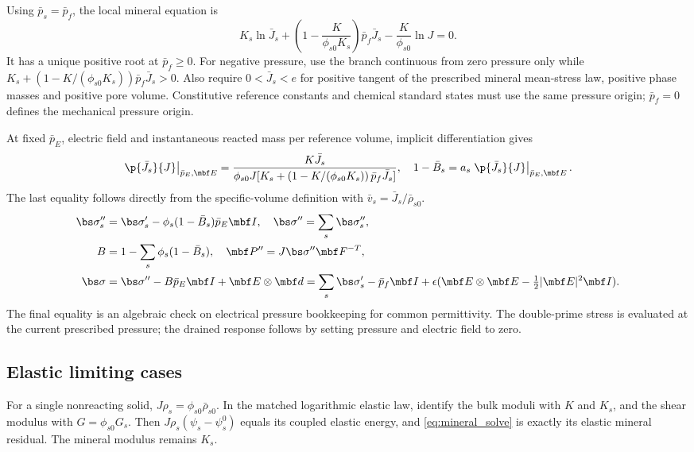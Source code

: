 \documentclass[11pt]{article}
\begin{document}
Using \(\bar p_s=\bar p_f\), the local mineral equation is
\begin{equation}
 K_s\ln\bar J_s+\left(1-\frac{K}{\phi_{s0}K_s}\right)\bar p_f\bar J_s-\frac{K}{\phi_{s0}}\ln J=0.
 \label{eq:mineral_solve}
\end{equation}
It has a unique positive root at \(\bar p_f\ge0\). For negative pressure, use the branch continuous from zero pressure only while
\(K_s+\left(1-K/(\phi_{s0}K_s)\right)\bar p_f\bar J_s>0\).
Also require \(0<\bar J_s<e\) for positive tangent of the prescribed mineral mean-stress law, positive phase masses and positive pore volume. Constitutive reference constants and chemical standard states must use the same pressure origin; \(\bar p_f=0\) defines the mechanical pressure origin.

At fixed \(\bar p_E\), electric field and instantaneous reacted mass per reference volume, implicit differentiation gives
\begin{equation}
 \left.\p{\bar J_s}{J}\right|_{\bar p_E,\mbf E}
 =\frac{K\bar J_s}{\phi_{s0}J[K_s+\left(1-K/(\phi_{s0}K_s)\right)\bar p_f\bar J_s]},
 \quad 1-\bar B_s=a_s\left.\p{\bar J_s}{J}\right|_{\bar p_E,\mbf E}.
 \label{eq:phase_biot}
\end{equation}
The last equality follows directly from the specific-volume definition with
\(\bar v_s=\bar J_s/\bar\rho_{s0}\).
\begin{align}
 \bs\sigma_s''&=\bs\sigma_s'-\phi_s(1-\bar B_s)\bar p_E\mbf I,
 \quad \bs\sigma''=\sum_s\bs\sigma_s'',\label{eq:biot_stress}\\
 B&=1-\sum_s\phi_s(1-\bar B_s),
 \quad \mbf P''=J\bs\sigma''\mbf F^{-T},\label{eq:biot_aggregate}\\
 \bs\sigma&=\bs\sigma''-B\bar p_E\mbf I+\mbf E\otimes\mbf d
 =\sum_s\bs\sigma_s'-\bar p_f\mbf I+
 \epsilon(\mbf E\otimes\mbf E-\tfrac12|\mbf E|^2\mbf I).\label{eq:total_stress}
\end{align}
The final equality is an algebraic check on electrical pressure bookkeeping for common permittivity. The double-prime stress is evaluated at the current prescribed pressure; the drained response follows by setting pressure and electric field to zero.

\subsection{Elastic limiting cases}
For a single nonreacting solid, \(J\rho_s=\phi_{s0}\bar\rho_{s0}\).
In the matched logarithmic elastic law, identify the bulk moduli with \(K\) and \(K_s\), and the shear modulus with \(G=\phi_{s0}G_s\). Then \(J\rho_s(\psi_s-\psi_s^0)\) equals its coupled elastic energy, and \eqref{eq:mineral_solve} is exactly its elastic mineral residual. The mineral modulus remains \(K_s\).
\end{document}
